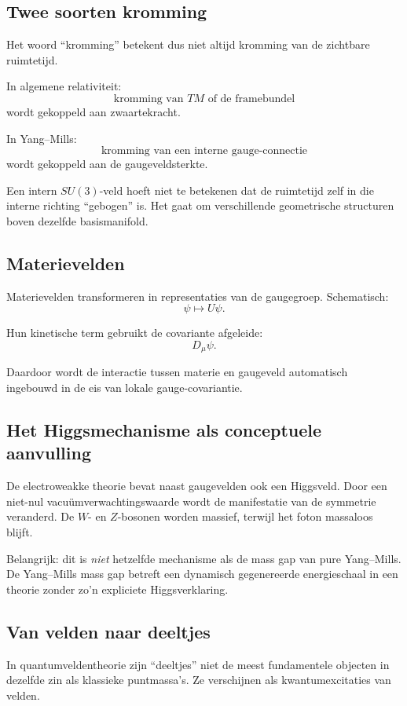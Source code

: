 \documentclass[11pt,a4paper]{article}
\begin{document}
\subsection{Twee soorten kromming}

Het woord ``kromming'' betekent dus niet altijd kromming van de zichtbare ruimtetijd.

In algemene relativiteit:
\[
\text{kromming van }TM\text{ of de framebundel}
\]
wordt gekoppeld aan zwaartekracht.

In Yang--Mills:
\[
\text{kromming van een interne gauge-connectie}
\]
wordt gekoppeld aan de gaugeveldsterkte.

Een intern $SU(3)$-veld hoeft niet te betekenen dat de ruimtetijd zelf in die interne richting ``gebogen'' is. Het gaat om verschillende geometrische structuren boven dezelfde basismanifold.

\subsection{Materievelden}

Materievelden transformeren in representaties van de gaugegroep. Schematisch:
\[
\psi\mapsto U\psi.
\]

Hun kinetische term gebruikt de covariante afgeleide:
\[
D_\mu\psi.
\]

Daardoor wordt de interactie tussen materie en gaugeveld automatisch ingebouwd in de eis van lokale gauge-covariantie.

\subsection{Het Higgsmechanisme als conceptuele aanvulling}

De electroweakke theorie bevat naast gaugevelden ook een Higgsveld. Door een niet-nul vacuümverwachtingswaarde wordt de manifestatie van de symmetrie veranderd. De $W$- en $Z$-bosonen worden massief, terwijl het foton massaloos blijft.

Belangrijk: dit is \emph{niet} hetzelfde mechanisme als de mass gap van pure Yang--Mills. De Yang--Mills mass gap betreft een dynamisch gegenereerde energieschaal in een theorie zonder zo'n expliciete Higgsverklaring.

\subsection{Van velden naar deeltjes}

In quantumveldentheorie zijn ``deeltjes'' niet de meest fundamentele objecten in dezelfde zin als klassieke puntmassa's. Ze verschijnen als kwantumexcitaties van velden.
\end{document}
